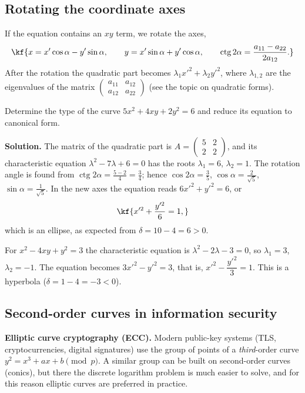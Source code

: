 \subsection{Rotating the coordinate axes}

If the equation contains an $xy$ term, we rotate the axes,
\[\kf{x=x'\cos\alpha-y'\sin\alpha,\qquad y=x'\sin\alpha+y'\cos\alpha,\qquad
\operatorname{ctg}2\alpha=\frac{a_{11}-a_{22}}{2a_{12}} .}\]
After the rotation the quadratic part becomes $\lambda_1x'^2+\lambda_2y'^2$,
where $\lambda_{1,2}$ are the eigenvalues of the matrix
$\begin{pmatrix}a_{11}&a_{12}\\a_{12}&a_{22}\end{pmatrix}$ (see the topic on
quadratic forms).

\begin{misol}
Determine the type of the curve $5x^2+4xy+2y^2=6$ and reduce its equation to
canonical form.

\textbf{Solution.} The matrix of the quadratic part is
$A=\begin{pmatrix}5&2\\2&2\end{pmatrix}$, and its characteristic equation
$\lambda^2-7\lambda+6=0$ has the roots $\lambda_1=6$, $\lambda_2=1$.
The rotation angle is found from $\operatorname{ctg}2\alpha=\frac{5-2}{4}=\frac34$;
hence $\cos2\alpha=\frac35$, $\cos\alpha=\frac{2}{\sqrt5}$, $\sin\alpha=\frac{1}{\sqrt5}$.
In the new axes the equation reads $6x'^2+y'^2=6$, or
\[\kf{x'^2+\frac{y'^2}{6}=1 ,}\]
which is an ellipse, as expected from $\delta=10-4=6>0$.
\end{misol}

\begin{misol}
For $x^2-4xy+y^2=3$ the characteristic equation is $\lambda^2-2\lambda-3=0$,
so $\lambda_1=3$, $\lambda_2=-1$. The equation becomes $3x'^2-y'^2=3$, that is,
$x'^2-\dfrac{y'^2}{3}=1$. This is a hyperbola ($\delta=1-4=-3<0$).
\end{misol}

\subsection{Second-order curves in information security}

\textbf{Elliptic curve cryptography (ECC).} Modern public-key systems (TLS,
cryptocurrencies, digital signatures) use the group of points of a
\emph{third}-order curve $y^2=x^3+ax+b \pmod p$. A similar group can be built
on second-order curves (conics), but there the discrete logarithm problem is
much easier to solve, and for this reason elliptic curves are preferred in
practice.


